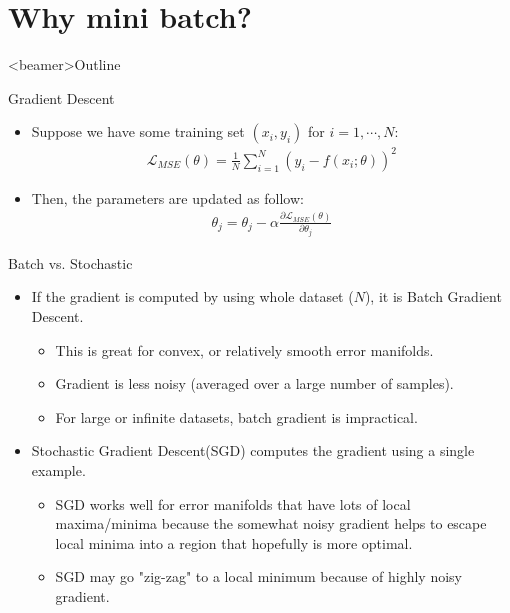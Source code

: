 \section{Why mini batch?}
\begin{frame}<beamer>{Outline}
  \end{frame}

\begin{frame}{Gradient Descent}

\begin{itemize}
  \item{Suppose we have some training set $(x_i,y_i)$ for $i=1,\cdots,N$:}
    \begin{align*}
    \mathcal{L}_{MSE}(\theta)=\frac{1}{N}\sum_{i=1}^{N}(y_i-f(x_i;\theta))^2
    \end{align*}
    \item{Then, the parameters are updated as follow:}
        \begin{align*}
        \theta_j=\theta_j - \alpha\frac{\partial\mathcal{L}_{MSE}(\theta)}{\partial\theta_j}
        \end{align*}
        \end{itemize}
\end{frame}
        
\begin{frame}{Batch vs. Stochastic}  
  \begin{itemize}
    \item{If the gradient is computed by using whole dataset ($N$), it is Batch Gradient Descent. }
	\begin{itemize}
	\item {This is great for convex, or relatively smooth error manifolds.}
	\item{Gradient is less noisy (averaged over a large number of samples).}
	\item{For large or infinite datasets, batch gradient is impractical.}
	\end{itemize}
	\item{Stochastic Gradient Descent(SGD) computes the gradient using a single example.} 	    
	\begin{itemize}
	\item {SGD works well for error manifolds that have lots of local maxima/minima because the somewhat noisy gradient helps to escape local minima into a region that hopefully is more optimal.}
	\item {SGD may go "zig-zag" to a local minimum because of highly noisy gradient.} 
	\end{itemize}
  \end{itemize}
\end{frame}



